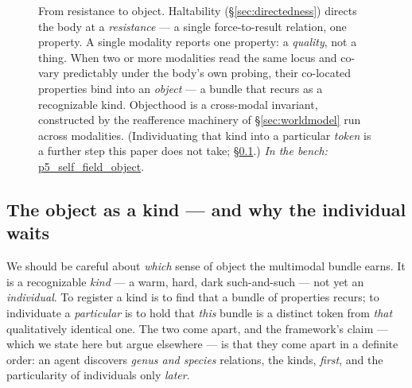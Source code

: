 \documentclass{article}
\newcommand{\rtdlink}[2]{\href{https://smn-lab.readthedocs.io/en/latest/#1}{#2}}
\begin{document}
\begin{figure}[!htbp]
\centering
{}
\caption{From resistance to object.  Haltability
(\S\ref{sec:directedness}) directs the body at a \emph{resistance} --- a
single force-to-result relation, one property.  A single modality reports
one property: a \emph{quality}, not a thing.  When two or more modalities
read the same locus and co-vary predictably under the body's own probing,
their co-located properties bind into an \emph{object} --- a bundle that
recurs as a recognizable kind.  Objecthood is a cross-modal invariant,
constructed by the reafference machinery of \S\ref{sec:worldmodel} run
across modalities.  (Individuating that kind into a particular
\emph{token} is a further step this paper does not take;
\S\ref{sec:object-particular}.)  \emph{In the bench:} \rtdlink{experiments/p5_self_field_object/}{p5\_self\_field\_object}.}
\label{fig:object-crossing}
\end{figure}

\subsection{The object as a kind --- and why the individual
waits}\label{sec:object-particular}

We should be careful about \emph{which} sense of object the multimodal
bundle earns.  It is a recognizable \emph{kind} --- a warm, hard, dark
such-and-such --- not yet an \emph{individual}.  To register a kind is to
find that a bundle of properties recurs; to individuate a
\emph{particular} is to hold that \emph{this} bundle is a distinct token
from \emph{that} qualitatively identical one.  The two come apart, and
the framework's claim --- which we state here but argue elsewhere --- is
that they come apart in a definite order: an agent discovers \emph{genus
and species} relations, the kinds, \emph{first}, and the particularity of
individuals only \emph{later}.
\end{document}

